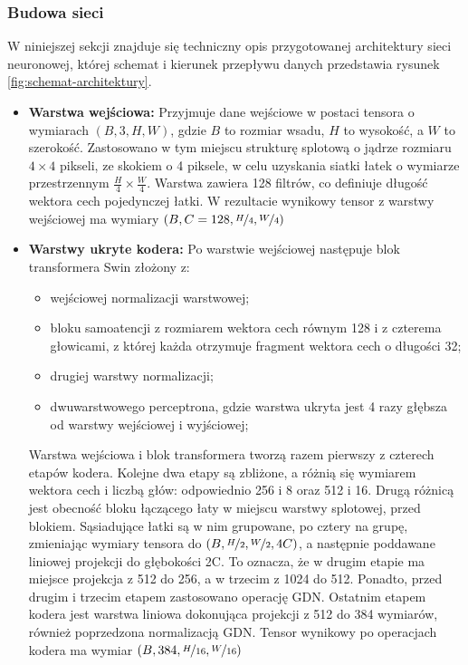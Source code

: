 \subsubsection{Budowa sieci}
W niniejszej sekcji znajduje się techniczny opis przygotowanej architektury sieci neuronowej, której schemat i kierunek przepływu danych przedstawia rysunek \ref{fig:schemat-architektury}.
\begin{itemize}
	\item \textbf{Warstwa wejściowa:} Przyjmuje dane wejściowe w postaci tensora o wymiarach \( \left(B, 3, H, W\right) \), gdzie \( B \) to rozmiar wsadu, \( H \) to wysokość, a \( W \) to szerokość. Zastosowano w tym miejscu strukturę splotową o jądrze rozmiaru \( 4 \times 4 \) pikseli, ze skokiem o 4 piksele, w celu uzyskania siatki łatek o wymiarze przestrzennym \( \frac{H}{4} \times \frac{W}{4} \). Warstwa zawiera 128 filtrów, co definiuje długość wektora cech pojedynczej łatki. W rezultacie wynikowy tensor z warstwy wejściowej ma wymiary \( \left(B, C=128, \nicefrac{H}{4}, \nicefrac{W}{4} \right) \)
	\item \textbf{Warstwy ukryte kodera:} Po warstwie wejściowej następuje blok transformera Swin złożony z:
	\begin{itemize}
		\item wejściowej normalizacji warstwowej;
		\item bloku samoatencji z rozmiarem wektora cech równym 128 i z czterema głowicami, z której każda otrzymuje fragment wektora cech o długości 32;
		\item drugiej warstwy normalizacji;
		\item dwuwarstwowego perceptrona, gdzie warstwa ukryta jest 4 razy głębsza od warstwy wejściowej i wyjściowej;
	\end{itemize}
	Warstwa wejściowa i blok transformera tworzą razem pierwszy z czterech etapów kodera. Kolejne dwa etapy są zbliżone, a różnią się wymiarem wektora cech i liczbą głów: odpowiednio 256 i 8 oraz 512 i 16. Drugą różnicą jest obecność bloku łączącego łaty w miejscu warstwy splotowej, przed blokiem. Sąsiadujące łatki są w nim grupowane, po cztery na grupę, zmieniając wymiary tensora do \( \left(B, \nicefrac{H}{2}, \nicefrac{W}{2}, 4C \right) \), a następnie poddawane liniowej projekcji do głębokości 2C. To oznacza, że w drugim etapie ma miejsce projekcja z 512 do 256, a w trzecim z 1024 do 512. Ponadto, przed drugim i trzecim etapem zastosowano operację GDN. Ostatnim etapem kodera jest warstwa liniowa dokonująca projekcji z 512 do 384 wymiarów, również poprzedzona normalizacją GDN. Tensor wynikowy po operacjach kodera ma wymiar \( \left(B, 384, \nicefrac{H}{16}, \nicefrac{W}{16} \right) \)

\end{itemize}
